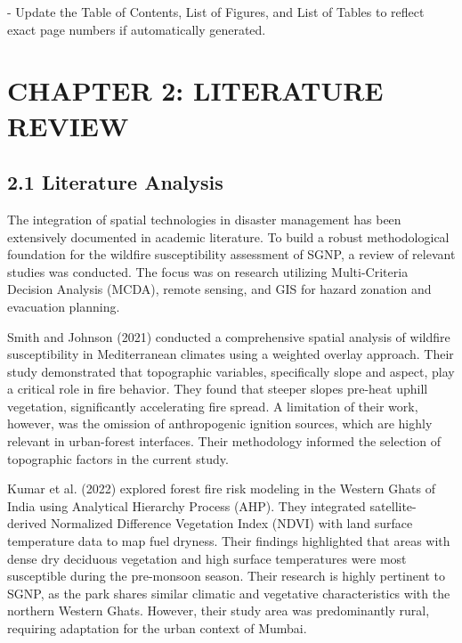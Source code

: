 \documentclass[12pt,a4paper]{article}
\begin{document}
- Update the Table of Contents, List of Figures, and List of Tables to reflect exact page numbers if automatically generated.



\clearpage
\section*{CHAPTER 2: LITERATURE REVIEW}


\subsection*{2.1 Literature Analysis}

The integration of spatial technologies in disaster management has been extensively documented in academic literature. To build a robust methodological foundation for the wildfire susceptibility assessment of SGNP, a review of relevant studies was conducted. The focus was on research utilizing Multi-Criteria Decision Analysis (MCDA), remote sensing, and GIS for hazard zonation and evacuation planning.


Smith and Johnson (2021) conducted a comprehensive spatial analysis of wildfire susceptibility in Mediterranean climates using a weighted overlay approach. Their study demonstrated that topographic variables, specifically slope and aspect, play a critical role in fire behavior. They found that steeper slopes pre-heat uphill vegetation, significantly accelerating fire spread. A limitation of their work, however, was the omission of anthropogenic ignition sources, which are highly relevant in urban-forest interfaces. Their methodology informed the selection of topographic factors in the current study.


Kumar et al. (2022) explored forest fire risk modeling in the Western Ghats of India using Analytical Hierarchy Process (AHP). They integrated satellite-derived Normalized Difference Vegetation Index (NDVI) with land surface temperature data to map fuel dryness. Their findings highlighted that areas with dense dry deciduous vegetation and high surface temperatures were most susceptible during the pre-monsoon season. Their research is highly pertinent to SGNP, as the park shares similar climatic and vegetative characteristics with the northern Western Ghats. However, their study area was predominantly rural, requiring adaptation for the urban context of Mumbai.
\end{document}
